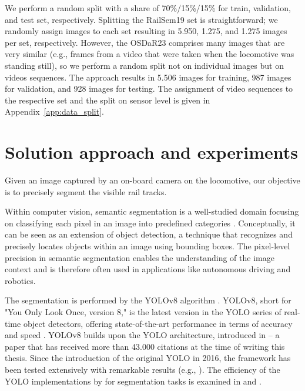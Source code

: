 \documentclass[Master,MDS,english]{BASE/twbook} %
\begin{document}
We perform a random split with a share of 70\%/15\%/15\% for train, validation, and test set, respectively. Splitting the RailSem19 set is straightforward; we randomly assign images to each set resulting in 5.950, 1.275, and 1.275 images per set, respectively. However, the OSDaR23 comprises many images that are very similar (e.g., frames from a video that were taken when the locomotive was standing still), so we perform a random split not on individual images but on videos sequences. The approach results in 5.506 images for training, 987 images for validation, and 928 images for testing.
The assignment of video sequences to the respective set and the split on sensor level is given in Appendix~\ref{app:data_split}.



\chapter{Solution approach and experiments} %

Given an image captured by an on-board camera on the locomotive, our objective is to precisely segment the visible rail tracks. %

Within computer vision, semantic segmentation is a well-studied domain focusing on classifying each pixel in an image into predefined categories \citep{MO2022626}. Conceptually, it 
can be seen as an extension of object detection, a technique that recognizes and precisely locates objects within an image using bounding boxes.
The pixel-level precision in semantic segmentation enables the understanding of the image context and is therefore often used in applications like autonomous driving and robotics.

 The segmentation is performed by the YOLOv8 algorithm \citep{Jocher_Ultralytics_YOLO_2023}.  YOLOv8, short for "You Only Look Once, version 8," is the latest version in the YOLO series of real-time object detectors, offering state-of-the-art performance in terms of accuracy and speed \citep{ultralytics_docs}. YOLOv8 builds upon the YOLO architecture, introduced in \cite{redmon2016you} -- a paper that has received more than 43.000 citations at the time of writing this thesis. Since the introduction of the original YOLO in 2016, the framework has been tested extensively with remarkable results (e.g., \cite{JIANG20221066, cryptography6020016, Diwan2023}). The efficiency of the YOLO implementations by \cite{Jocher_Ultralytics_YOLO_2023} for segmentation tasks is examined in \cite{agriculture13081643} and \cite{STRAKER2023100045}.
\end{document}
